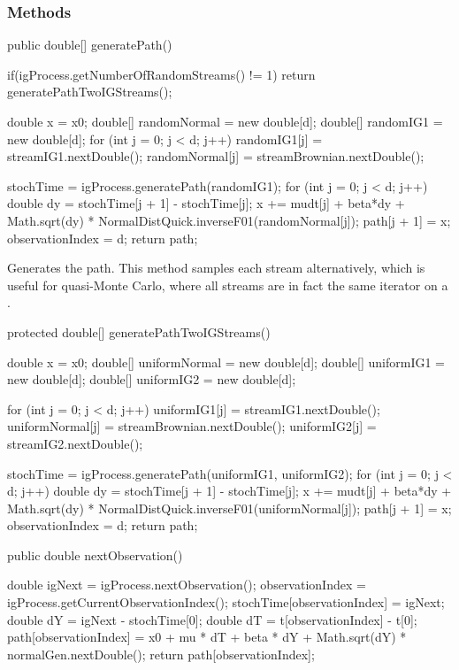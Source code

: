 \subsubsection* {Methods}
\begin{code}

   public double[] generatePath() \begin{hide} {
        if(igProcess.getNumberOfRandomStreams() != 1)
            return generatePathTwoIGStreams();

        double x = x0;
        double[] randomNormal = new double[d];
        double[] randomIG1 = new double[d];
        for (int j = 0; j < d; j++)
        {
            randomIG1[j]    = streamIG1.nextDouble();
            randomNormal[j] = streamBrownian.nextDouble();
        }

        stochTime = igProcess.generatePath(randomIG1);
        for (int j = 0; j < d; j++)
        {
            double dy = stochTime[j + 1] - stochTime[j];
            x += mudt[j] + beta*dy + 
                 Math.sqrt(dy) * NormalDistQuick.inverseF01(randomNormal[j]);
            path[j + 1] = x;
        }
        observationIndex = d;
        return path;
    }\end{hide}
\end{code}
\begin{tabb} 
Generates the path.  
This method samples each stream alternatively,
which is useful for quasi-Monte Carlo, where
all streams are in fact the same iterator on 
 a .
\end{tabb}
\begin{code}\begin{hide}

    protected double[] generatePathTwoIGStreams() {
        double x = x0;
        double[] uniformNormal = new double[d];
        double[] uniformIG1 = new double[d];
        double[] uniformIG2 = new double[d];

        for (int j = 0; j < d; j++)
        {
            uniformIG1[j]    = streamIG1.nextDouble();
            uniformNormal[j] = streamBrownian.nextDouble();
            uniformIG2[j]    = streamIG2.nextDouble();
        }

        stochTime = igProcess.generatePath(uniformIG1, uniformIG2);
        for (int j = 0; j < d; j++)
        {
            double dy = stochTime[j + 1] - stochTime[j];
            x += mudt[j] + beta*dy + 
                 Math.sqrt(dy) * NormalDistQuick.inverseF01(uniformNormal[j]);
            path[j + 1] = x;
        }
        observationIndex = d;
        return path;
    }\end{hide}

   public double nextObservation() \begin{hide} {
       double igNext = igProcess.nextObservation();
       observationIndex = igProcess.getCurrentObservationIndex();
       stochTime[observationIndex]  = igNext;
       double dY = igNext - stochTime[0];
       double dT = t[observationIndex] - t[0];
       path[observationIndex] = x0  +  mu * dT  +  beta * dY  +
                                Math.sqrt(dY) * normalGen.nextDouble();
       return path[observationIndex];
    }\end{hide}
\end{code}
